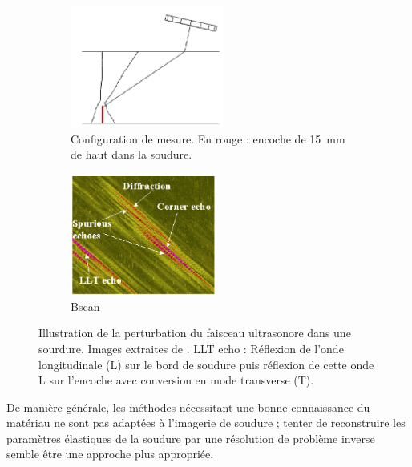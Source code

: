 \begin{figure}[!h]
    \centering
    \begin{subfigure}[c]{0.3\textwidth}
    	\centering
        \includegraphics[height=4cm]{img/chassignole_echos_config.png}
        \caption{ Configuration de mesure. En rouge : encoche de 15~mm de haut dans la soudure.}
    \end{subfigure}
    \hspace{1cm}
    \begin{subfigure}[c]{0.3\textwidth}
    	\centering
        \includegraphics[height=4cm]{img/chassignole_echos.png}
        \caption{Bscan}
    \end{subfigure}
    \caption{Illustration de la perturbation du faisceau ultrasonore dans une sourdure. Images extraites de \cite{chassignole_beam}. LLT echo : Réflexion de l'onde longitudinale (L) sur le bord de soudure puis réflexion de cette onde L sur l'encoche avec conversion en mode transverse (T).  }\label{echos}
\end{figure}

De manière générale, les méthodes nécessitant une bonne connaissance du matériau ne sont pas adaptées à l'imagerie de soudure ; tenter de reconstruire les paramètres élastiques de la soudure par une résolution de problème inverse semble être une approche plus appropriée.






